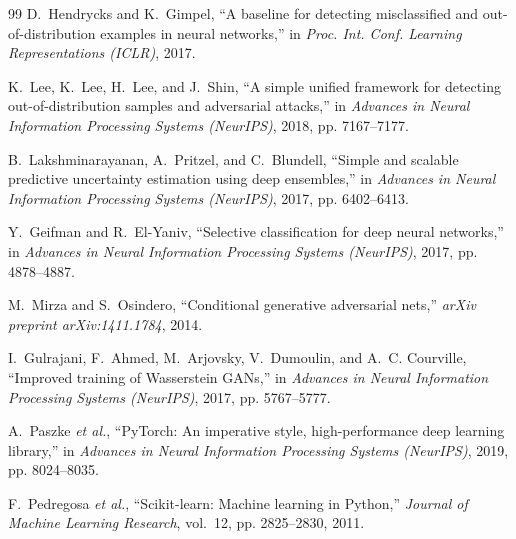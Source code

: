 \documentclass[conference]{IEEEtran}
\begin{document}
\begin{thebibliography}{99}
D.~Hendrycks and K.~Gimpel, ``A baseline for detecting misclassified and out-of-distribution examples in neural networks,'' in \textit{Proc. Int. Conf. Learning Representations (ICLR)}, 2017.

K.~Lee, K.~Lee, H.~Lee, and J.~Shin, ``A simple unified framework for detecting out-of-distribution samples and adversarial attacks,'' in \textit{Advances in Neural Information Processing Systems (NeurIPS)}, 2018, pp. 7167--7177.

B.~Lakshminarayanan, A.~Pritzel, and C.~Blundell, ``Simple and scalable predictive uncertainty estimation using deep ensembles,'' in \textit{Advances in Neural Information Processing Systems (NeurIPS)}, 2017, pp. 6402--6413.

Y.~Geifman and R.~El-Yaniv, ``Selective classification for deep neural networks,'' in \textit{Advances in Neural Information Processing Systems (NeurIPS)}, 2017, pp. 4878--4887.

M.~Mirza and S.~Osindero, ``Conditional generative adversarial nets,'' \textit{arXiv preprint arXiv:1411.1784}, 2014.

I.~Gulrajani, F.~Ahmed, M.~Arjovsky, V.~Dumoulin, and A.~C. Courville, ``Improved training of Wasserstein GANs,'' in \textit{Advances in Neural Information Processing Systems (NeurIPS)}, 2017, pp. 5767--5777.

A.~Paszke \textit{et al.}, ``PyTorch: An imperative style, high-performance deep learning library,'' in \textit{Advances in Neural Information Processing Systems (NeurIPS)}, 2019, pp. 8024--8035.

F.~Pedregosa \textit{et al.}, ``Scikit-learn: Machine learning in Python,'' \textit{Journal of Machine Learning Research}, vol.~12, pp. 2825--2830, 2011.

\end{thebibliography}
\end{document}
